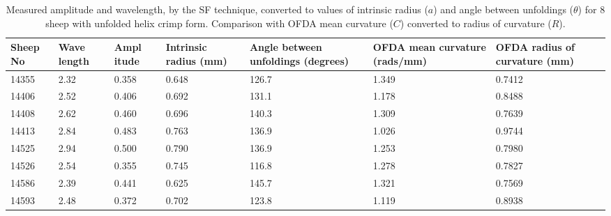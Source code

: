 %

\begin{table}[htp]
\centering
\caption{Measured amplitude and wavelength, by the SF technique, converted to values of intrinsic radius ($a$) and angle between unfoldings ($\theta$) for 8 sheep with unfolded helix crimp form. Comparison with OFDA mean curvature ($C$) converted to radius of curvature ($R$).}
\label{tab:waradthetaunfold}
\vspace{0.1in}
\begin{tabular}{|p{0.4in}|p{0.4in}|p{0.4in}|p{0.6in}|p{0.6in}|p{0.5in}|p{0.6in}|} \hline
  Sheep No &   Wave length  & Ampl itude & Intrinsic radius (mm)  & Angle between unfoldings (degrees) &  OFDA mean curvature (rads/mm) & OFDA radius of curvature (mm) \\  \hline
  14355 & 2.32  & 0.358  & 0.648 & 126.7  & 1.349 & 0.7412   \\ 
  14406 & 2.52  & 0.406  & 0.692 & 131.1 & 1.178 & 0.8488   \\
  14408 & 2.62  & 0.460  & 0.696 & 140.3 & 1.309 & 0.7639   \\
  14413 & 2.84  & 0.483  & 0.763 & 136.9 & 1.026 & 0.9744   \\ 
  14525 & 2.94  & 0.500  & 0.790 & 136.9 & 1.253 & 0.7980   \\
  14526 & 2.54  & 0.355  & 0.745 & 116.8 & 1.278 & 0.7827   \\
  14586 & 2.39  & 0.441  & 0.625 & 145.7 & 1.321 & 0.7569   \\ 
  14593 & 2.48  & 0.372  & 0.702 & 123.8 & 1.119 & 0.8938   \\ \hline
\end{tabular}
\end{table}

%
